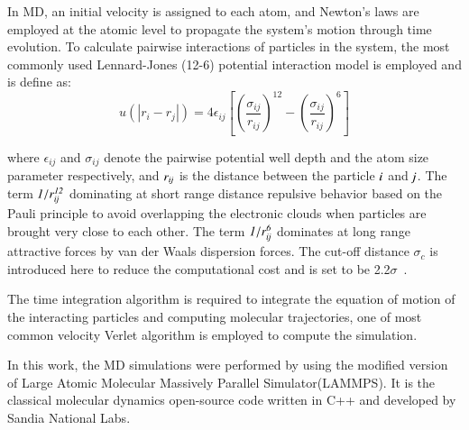 \documentclass[preprint,12pt]{elsarticle}
\begin{document}


In MD, an initial velocity is assigned to each atom, and Newton's laws are employed at the atomic level to propagate the system's motion through time evolution. To calculate pairwise interactions of particles in the system,  the most commonly used Lennard-Jones (12-6) potential interaction model is employed and is define as: 
\vspace{-.2em}
\begin{equation}
 u(|r_{i} - r_{j}|) = 4\epsilon_{ij}[(\frac{\sigma_{ij}}{r_{ij}})^{12}-(\frac{\sigma_{ij}}{r_{ij}})^{6}]
 \label{eq:LJ12}
\end{equation}
\normalsize

where $\epsilon_{ij}$ and $\sigma_{ij}$ denote the pairwise potential well depth and the atom size parameter respectively, and $\it r_{ij}$ is the distance between the particle $\it i$ and $\it j$. The term $\it 1/r_{ij}^{12}$ dominating at short range distance repulsive behavior based on the Pauli principle to avoid overlapping the electronic clouds when particles are  brought very close to each other. The term $\it 1/r_{ij}^6$ dominates at long range attractive forces by van der Waals dispersion forces. The cut-off distance $\sigma_{c}$ is introduced here to reduce the computational cost and is set to be 2.2$\sigma$~\cite{Travis}.

The time integration algorithm is required to integrate the equation of motion of the interacting particles and computing molecular trajectories, one of most common velocity Verlet algorithm is employed to compute the simulation.

In this work,  the MD simulations were performed by using the modified version of Large Atomic Molecular Massively Parallel Simulator(LAMMPS). It is the classical molecular dynamics open-source code written in C++ and developed by Sandia National Labs.~\cite{LAMMPS}


\end{document}

